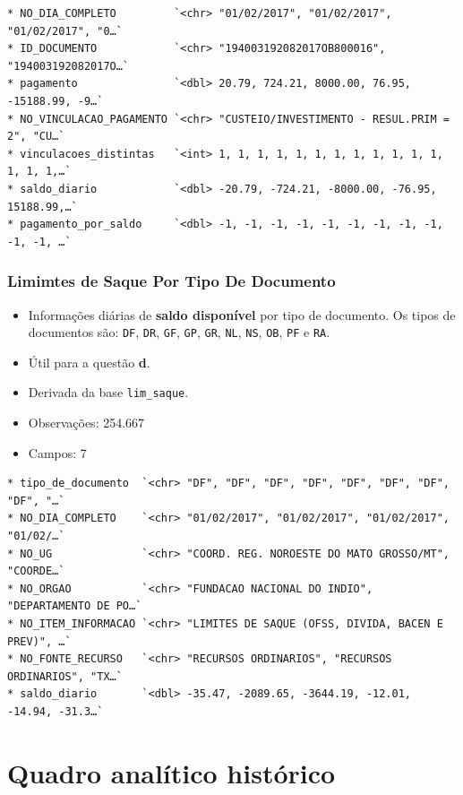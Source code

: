 \documentclass[]{book}
\begin{document}
\begin{verbatim}
* NO_DIA_COMPLETO         `<chr> "01/02/2017", "01/02/2017", "01/02/2017", "0…`
* ID_DOCUMENTO            `<chr> "194003192082017OB800016", "194003192082017O…`
* pagamento               `<dbl> 20.79, 724.21, 8000.00, 76.95, -15188.99, -9…`
* NO_VINCULACAO_PAGAMENTO `<chr> "CUSTEIO/INVESTIMENTO - RESUL.PRIM = 2", "CU…`
* vinculacoes_distintas   `<int> 1, 1, 1, 1, 1, 1, 1, 1, 1, 1, 1, 1, 1, 1, 1,…`
* saldo_diario            `<dbl> -20.79, -724.21, -8000.00, -76.95, 15188.99,…`
* pagamento_por_saldo     `<dbl> -1, -1, -1, -1, -1, -1, -1, -1, -1, -1, -1, …`
\end{verbatim}

\hypertarget{limimtes-de-saque-por-tipo-de-documento}{%
\subsection{Limimtes de Saque Por Tipo De Documento}\label{limimtes-de-saque-por-tipo-de-documento}}

\begin{itemize}
\item
  Informações diárias de \textbf{saldo disponível} por tipo de documento. Os tipos de documentos são: \texttt{DF}, \texttt{DR}, \texttt{GF}, \texttt{GP}, \texttt{GR}, \texttt{NL}, \texttt{NS}, \texttt{OB}, \texttt{PF} e \texttt{RA}.
\item
  Útil para a questão \textbf{d}.
\item
  Derivada da base \texttt{lim\_saque}.
\item
  Observações: 254.667
\item
  Campos: 7
\end{itemize}

\begin{verbatim}
* tipo_de_documento  `<chr> "DF", "DF", "DF", "DF", "DF", "DF", "DF", "DF", "…`
* NO_DIA_COMPLETO    `<chr> "01/02/2017", "01/02/2017", "01/02/2017", "01/02/…`
* NO_UG              `<chr> "COORD. REG. NOROESTE DO MATO GROSSO/MT", "COORDE…`
* NO_ORGAO           `<chr> "FUNDACAO NACIONAL DO INDIO", "DEPARTAMENTO DE PO…`
* NO_ITEM_INFORMACAO `<chr> "LIMITES DE SAQUE (OFSS, DIVIDA, BACEN E PREV)", …`
* NO_FONTE_RECURSO   `<chr> "RECURSOS ORDINARIOS", "RECURSOS ORDINARIOS", "TX…`
* saldo_diario       `<dbl> -35.47, -2089.65, -3644.19, -12.01, -14.94, -31.3…`
\end{verbatim}

\hypertarget{quadro-analitico-historico}{%
\chapter{Quadro analítico histórico}\label{quadro-analitico-historico}}
\end{document}
